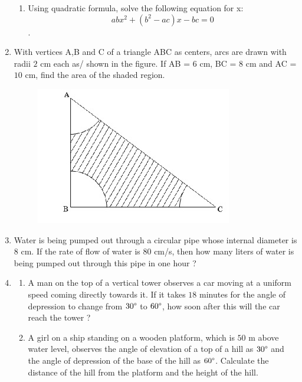 \documentclass{article}
\begin{document}
\begin{enumerate}
\begin{enumerate}
					
		\item Using quadratic formula, solve the following equation for x:$$abx^{2} + (b^{2} - ac)x - bc = 0$$.
	\end{enumerate}
	\item With vertices A,B and C of a triangle ABC as centers, arcs are drawn with radii $2$ cm each as/ shown in the figure. If AB = $6$ cm, BC = $8$ cm and AC = $10$ cm, find the area of the shaded region.	  	
	\begin{figure}[h]
	      			\centering
	      			\includegraphics[width=\columnwidth]{Fig/q9.jpg}
				\caption{}
				\label{}
      \end{figure}
	\item Water is being pumped out through a circular pipe whose internal diameter is $8$ cm. If the rate of flow of water is $80$ cm/s, then how many liters of water is being pumped out through this pipe in one hour ?
	\item 
	\begin{enumerate}
		\item A man on the top of a vertical tower observes a car moving at a uniform speed coming directly towards it. If it takes $18$ minutes for the angle of depression to change from $30\degree$ to $60\degree$, how soon after this will the car reach the tower ?

		\item A girl on a ship standing on a wooden platform, which is $50$ m above water level, observes the angle of elevation of a top of a hill as $30\degree$ and the angle of depression of the base of the hill as $60\degree$. Calculate the distance of the hill from the platform and the height of the hill.
	\end{enumerate}
\end{enumerate}
\end{document}
